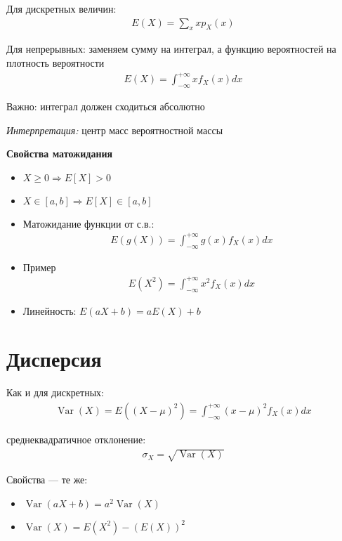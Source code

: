 \documentclass[12pt]{article}
\DeclareMathOperator{\Var}{Var}
\begin{document}
  Для дискретных величин:
  \begin{align*}
      E(X) = \sum_x x p_X(x)
  \end{align*}

  Для непрерывных: заменяем сумму на интеграл, а функцию вероятностей на плотность вероятности
  \begin{align*}
      E(X) = \int_{-\infty}^{+\infty} x f_X(x) dx
  \end{align*}

  Важно: интеграл должен сходиться абсолютно

  \emph{Интерпретация:} центр масс вероятностной массы

  \textbf{Свойства матожидания}

  \begin{itemize}
    \item $X \ge 0 \Rightarrow E[X] > 0$
    \item $X \in [a, b] \Rightarrow E[X] \in [a, b]$
    \item Матожидание функции от с.в.:
    \begin{align*}
        E(g(X)) = \int_{-\infty}^{+\infty} g(x) f_X(x) dx
    \end{align*}
    \item Пример
    \begin{align*}
        E(X^2) = \int_{-\infty}^{+\infty} x^2 f_X(x) dx
    \end{align*}
    \item Линейность: $E(aX + b) = aE(X) + b$
  \end{itemize}

  \section{Дисперсия}

  Как и для дискретных:
  \begin{align*}
      \Var(X) = E((X - \mu)^2) = \int_{-\infty}^{+\infty} (x - \mu)^2 f_X(x) dx
  \end{align*}

  среднеквадратичное отклонение:
  \begin{align*}
      \sigma_X = \sqrt{\Var(X)}
  \end{align*}

  Свойства --- те же:
  \begin{itemize}
      \item $\Var(aX + b) = a^2\Var(X)$
      \item $\Var(X) = E(X^2) - (E(X))^2$
  \end{itemize}
\end{document}
